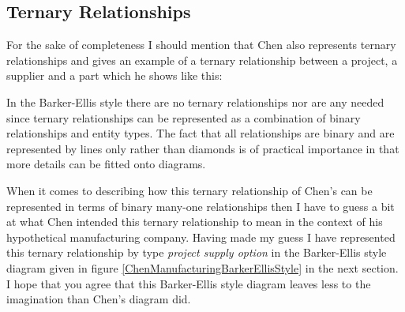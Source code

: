 \subsection*{Ternary Relationships}
For the sake of completeness I should mention that Chen also represents ternary relationships and gives an 
example of a ternary relationship between a project, a supplier and a part which he shows like this:


\begin{center}
\scalebox{0.9}{}
\end{center}

In the Barker-Ellis style there are no ternary relationships nor are any needed since ternary relationships can be represented as a combination of binary relationships and entity types. The fact that all relationships are binary and are represented by lines only rather than diamonds  is of practical importance in that more details can be fitted onto diagrams.

\mynote
When it comes to describing how this ternary relationship of Chen's can be represented in terms of binary many-one relationships then I have to guess a bit at what Chen intended this ternary relationship to mean in the context of his hypothetical manufacturing company. 
Having made my guess I have represented this ternary relationship by type \textit{project supply option} 
in the Barker-Ellis style diagram given  in figure \ref{ChenManufacturingBarkerEllisStyle} in the next section. I hope that you agree that this Barker-Ellis style diagram leaves less to the imagination than Chen's diagram did.